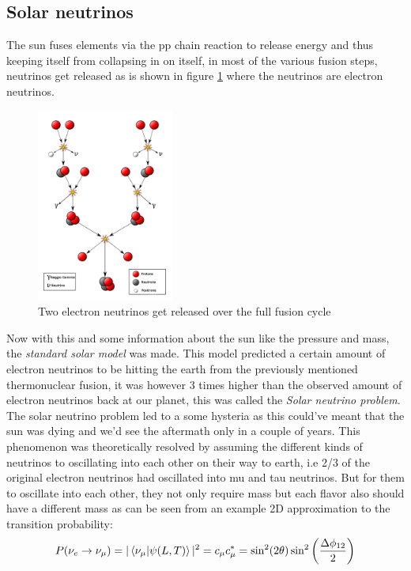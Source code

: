 \subsection{Solar neutrinos}
The sun fuses elements via the pp chain reaction to release energy and thus
keeping itself from collapsing in on itself, in most of the various fusion
steps, neutrinos get released as is shown in figure
\ref{fig:SunFusion} where the neutrinos are electron
neutrinos.
\begin{figure}
	\centering
	\includegraphics[width=0.4\textwidth]{figures/SunFusion.png}
	\caption{Two electron neutrinos get released over the full fusion cycle}
	\label{fig:SunFusion}
\end{figure}
Now with this and some information about the sun like the pressure and mass,
the \textit{standard solar model} was made. This model predicted a certain
amount of electron neutrinos to be hitting the earth from the previously mentioned
thermonuclear fusion, it was however 3 times higher than the observed amount of
electron neutrinos back at our planet\cite{Cleveland_1998}, this was called the \textit{Solar neutrino problem}. 
The solar neutrino problem led to a some hysteria as this could've meant
that the sun was dying and we'd see the aftermath only in a couple of years.
This phenomenon was theoretically resolved by assuming\cite{Bilenky2013} the 
different kinds of neutrinos to oscillating into each other on their way to
earth, i.e 2/3 of the original electron neutrinos had oscillated into mu and
tau neutrinos. But for them to oscillate into each other, they not
only require mass but each flavor also should have a different mass as can be seen
from an example 2D approximation to the transition probability\cite{Bellini_2014}:
\begin{equation}
	P(\nu_e\rightarrow\nu_\mu) = |\braket{\nu_\mu|\psi(L,T)}|^2 = c_\mu c_\mu^* = \sin ^2(2 \theta) \sin ^2\left(\frac{\Delta \phi_{12}}{2}\right)
\end{equation}
